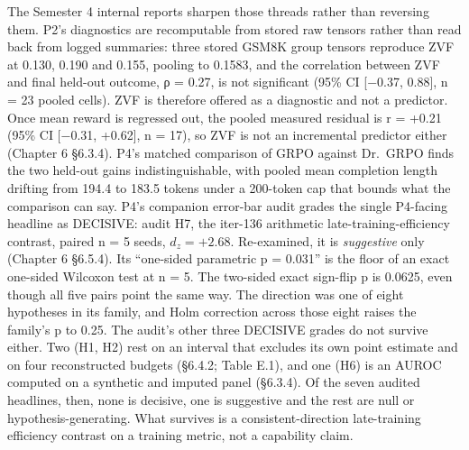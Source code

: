 \documentclass[12pt,a4paper]{report}
\begin{document}
The Semester 4 internal reports sharpen those threads rather than
reversing them. P2's diagnostics are recomputable from stored raw
tensors rather than read back from logged summaries: three stored GSM8K
group tensors reproduce ZVF at 0.130, 0.190 and 0.155, pooling to
0.1583, and the correlation between ZVF and final held-out outcome, ρ =
0.27, is not significant (95\% CI {[}−0.37, 0.88{]}, n = 23 pooled
cells). ZVF is therefore offered as a diagnostic and not a predictor.
Once mean reward is regressed out, the pooled measured residual is r =
+0.21 (95\% CI {[}−0.31, +0.62{]}, n = 17), so ZVF is not an incremental
predictor either (Chapter 6 §6.3.4). P4's matched comparison of GRPO
against Dr.~GRPO finds the two held-out gains indistinguishable, with
pooled mean completion length drifting from 194.4 to 183.5 tokens under
a 200-token cap that bounds what the comparison can say. P4's companion
error-bar audit grades the single P4-facing headline as DECISIVE: audit
H7, the iter-136 arithmetic late-training-efficiency contrast, paired n
= 5 seeds, \(d_z = +2.68\). Re-examined, it is \emph{suggestive} only
(Chapter 6 §6.5.4). Its ``one-sided parametric p = 0.031'' is the floor
of an exact one-sided Wilcoxon test at n = 5. The two-sided exact
sign-flip p is 0.0625, even though all five pairs point the same way.
The direction was one of eight hypotheses in its family, and Holm
correction across those eight raises the family's p to 0.25. The audit's
other three DECISIVE grades do not survive either. Two (H1, H2) rest on
an interval that excludes its own point estimate and on four
reconstructed budgets (§6.4.2; Table E.1), and one (H6) is an AUROC
computed on a synthetic and imputed panel (§6.3.4). Of the seven audited
headlines, then, none is decisive, one is suggestive and the rest are
null or hypothesis-generating. What survives is a consistent-direction
late-training efficiency contrast on a training metric, not a capability
claim.
\end{document}
